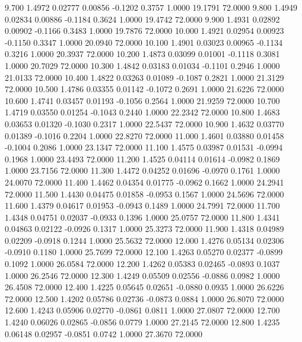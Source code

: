    9.700   1.4972   0.02777   0.00856  -0.1202   0.3757   1.0000  19.1791  72.0000
   9.800   1.4949   0.02834   0.00886  -0.1184   0.3624   1.0000  19.4742  72.0000
   9.900   1.4931   0.02892   0.00902  -0.1166   0.3483   1.0000  19.7876  72.0000
  10.000   1.4921   0.02954   0.00923  -0.1150   0.3347   1.0000  20.0940  72.0000
  10.100   1.4901   0.03023   0.00965  -0.1134   0.3216   1.0000  20.3937  72.0000
  10.200   1.4873   0.03099   0.01001  -0.1118   0.3081   1.0000  20.7029  72.0000
  10.300   1.4842   0.03183   0.01034  -0.1101   0.2946   1.0000  21.0133  72.0000
  10.400   1.4822   0.03263   0.01089  -0.1087   0.2821   1.0000  21.3129  72.0000
  10.500   1.4786   0.03355   0.01142  -0.1072   0.2691   1.0000  21.6226  72.0000
  10.600   1.4741   0.03457   0.01193  -0.1056   0.2564   1.0000  21.9259  72.0000
  10.700   1.4719   0.03550   0.01254  -0.1043   0.2440   1.0000  22.2342  72.0000
  10.800   1.4683   0.03653   0.01320  -0.1030   0.2317   1.0000  22.5437  72.0000
  10.900   1.4632   0.03770   0.01389  -0.1016   0.2204   1.0000  22.8270  72.0000
  11.000   1.4601   0.03880   0.01458  -0.1004   0.2086   1.0000  23.1347  72.0000
  11.100   1.4575   0.03987   0.01531  -0.0994   0.1968   1.0000  23.4493  72.0000
  11.200   1.4525   0.04114   0.01614  -0.0982   0.1869   1.0000  23.7156  72.0000
  11.300   1.4472   0.04252   0.01696  -0.0970   0.1761   1.0000  24.0070  72.0000
  11.400   1.4462   0.04354   0.01775  -0.0962   0.1662   1.0000  24.2941  72.0000
  11.500   1.4430   0.04475   0.01858  -0.0953   0.1567   1.0000  24.5696  72.0000
  11.600   1.4379   0.04617   0.01953  -0.0943   0.1489   1.0000  24.7991  72.0000
  11.700   1.4348   0.04751   0.02037  -0.0933   0.1396   1.0000  25.0757  72.0000
  11.800   1.4341   0.04863   0.02122  -0.0926   0.1317   1.0000  25.3273  72.0000
  11.900   1.4318   0.04989   0.02209  -0.0918   0.1244   1.0000  25.5632  72.0000
  12.000   1.4276   0.05134   0.02306  -0.0910   0.1180   1.0000  25.7699  72.0000
  12.100   1.4263   0.05270   0.02377  -0.0899   0.1092   1.0000  26.0584  72.0000
  12.200   1.4262   0.05383   0.02465  -0.0893   0.1037   1.0000  26.2546  72.0000
  12.300   1.4249   0.05509   0.02556  -0.0886   0.0982   1.0000  26.4508  72.0000
  12.400   1.4225   0.05645   0.02651  -0.0880   0.0935   1.0000  26.6226  72.0000
  12.500   1.4202   0.05786   0.02736  -0.0873   0.0884   1.0000  26.8070  72.0000
  12.600   1.4243   0.05906   0.02770  -0.0861   0.0811   1.0000  27.0807  72.0000
  12.700   1.4240   0.06026   0.02865  -0.0856   0.0779   1.0000  27.2145  72.0000
  12.800   1.4235   0.06148   0.02957  -0.0851   0.0742   1.0000  27.3670  72.0000
